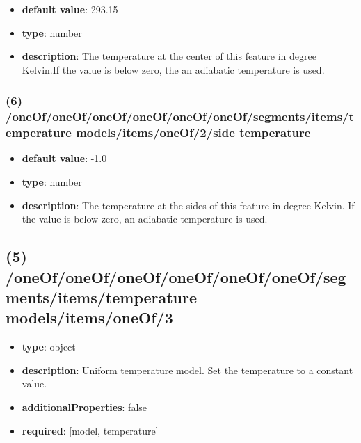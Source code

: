 \begin{itemize}[leftmargin=6em]\item {\bf default value}: 293.15
\item {\bf type}: number
\item {\bf description}: The temperature at the center of this feature in degree Kelvin.If the value is below zero, the an adiabatic temperature is used.
\end{itemize}\subsubsection{(6) /oneOf/oneOf/oneOf/oneOf/oneOf/oneOf/segments/items/temperature models/items/oneOf/2/side temperature}
\begin{itemize}[leftmargin=6em]\item {\bf default value}: -1.0
\item {\bf type}: number
\item {\bf description}: The temperature at the sides of this feature in degree Kelvin. If the value is below zero, an adiabatic temperature is used.
\end{itemize}\subsection{(5) /oneOf/oneOf/oneOf/oneOf/oneOf/oneOf/segments/items/temperature models/items/oneOf/3}
\begin{itemize}[leftmargin=5em]\item {\bf type}: object
\item {\bf description}: Uniform temperature model. Set the temperature to a constant value.
\item {\bf additionalProperties}: false
\item {\bf required}: [model, temperature]\end{itemize}
